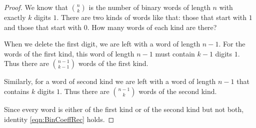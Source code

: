 

\setcounter{section}{3}
\setcounter{subsection}{4}
\setcounter{dfn}{6}

\begin{proof}
We know that $\binom{n}{k}$ is the number of binary words of length $n$ with exactly $k$ digits $1$.
There are two kinds of words like that: those that start with $1$ and those that start with $0$.
How many words of each kind are there?

When we delete the first digit, we are left with a word of length $n-1$.
For the words of the first kind, this word of length $n-1$ must contain $k-1$ digits $1$.
Thus there are $\binom{n-1}{k-1}$ words of the first kind.

Similarly, for a word of second kind we are left with a word of length $n-1$ that contains $k$ digits $1$.
Thus there are $\binom{n-1}k$ words of the second kind.

Since every word is either of the first kind or of the second kind but not both,
identity \eqref{eqn:BinCoeffRec} holds.
\end{proof}

